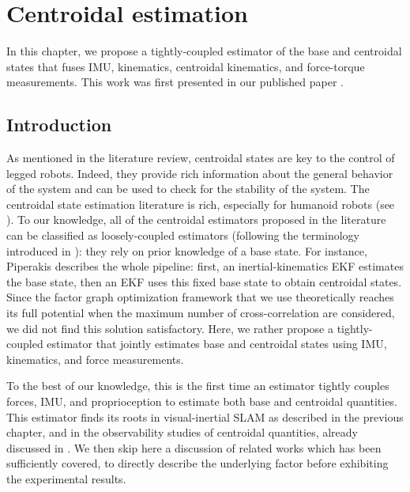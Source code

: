 \chapter{Centroidal estimation}
\label{chp:centroidal_estimation}
\minitoc
\bigskip


In this chapter, we propose a tightly-coupled estimator of the base and centroidal states that fuses IMU, kinematics, centroidal kinematics, 
and force-torque measurements. This work was first presented in our published paper \cite{fourmy2021contact}.

\section{Introduction}

As mentioned in the literature review, centroidal states are key to the control of legged robots. Indeed, they provide rich information about the general
behavior of the system and can be used to check for the stability of the system. The centroidal state estimation literature is rich, especially for humanoid
robots (see ). To our knowledge, all of the centroidal estimators proposed in the literature can be classified as loosely-coupled estimators 
(following the terminology introduced in ): they rely on prior knowledge of a base state. For instance, Piperakis \cite{piperakis2018nonlinear} 
describes the whole pipeline: first, an inertial-kinematics EKF estimates the base state, then an EKF uses this fixed base state to obtain centroidal states. 
Since the factor graph optimization framework that we use theoretically reaches its full potential when the maximum number of cross-correlation
are considered, we did not find this solution satisfactory. Here, we rather propose a tightly-coupled estimator that jointly estimates
base and centroidal states using IMU, kinematics, and force measurements.



To the best of our knowledge, this is the first time an estimator tightly couples forces, IMU, and proprioception to estimate both base and centroidal
quantities. This estimator finds its roots in visual-inertial SLAM as described in the previous chapter,
and in the observability studies of centroidal quantities, already discussed in . We then skip here a discussion of related
works which has been sufficiently covered, to directly describe the underlying factor before exhibiting the experimental results.


